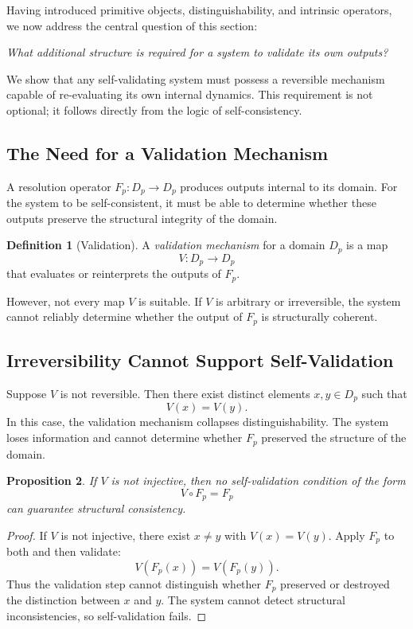 \documentclass[11pt]{article}
\theoremstyle{definition}
\newtheorem{definition}{Definition}[section]
\theoremstyle{plain}
\newtheorem{proposition}[definition]{Proposition}
\theoremstyle{remark}
\begin{document}
Having introduced primitive objects, distinguishability, and intrinsic
operators, we now address the central question of this section:

\emph{What additional structure is required for a system to validate its
own outputs?}

We show that any self-validating system must possess a reversible
mechanism capable of re-evaluating its own internal dynamics. This
requirement is not optional; it follows directly from the logic of
self-consistency.

\subsection{The Need for a Validation Mechanism}

A resolution operator $F_p : D_p \to D_p$ produces outputs internal to
its domain. For the system to be self-consistent, it must be able to
determine whether these outputs preserve the structural integrity of the
domain.

\begin{definition}[Validation]
A \emph{validation mechanism} for a domain $D_p$ is a map
\[
V : D_p \to D_p
\]
that evaluates or reinterprets the outputs of $F_p$.
\end{definition}

However, not every map $V$ is suitable. If $V$ is arbitrary or
irreversible, the system cannot reliably determine whether the output of
$F_p$ is structurally coherent.

\subsection{Irreversibility Cannot Support Self-Validation}

Suppose $V$ is not reversible. Then there exist distinct elements
$x,y \in D_p$ such that
\[
V(x) = V(y).
\]
In this case, the validation mechanism collapses distinguishability. The
system loses information and cannot determine whether $F_p$ preserved
the structure of the domain.

\begin{proposition}
If $V$ is not injective, then no self-validation condition of the form
\[
V \circ F_p = F_p
\]
can guarantee structural consistency.
\end{proposition}

\begin{proof}
If $V$ is not injective, there exist $x \neq y$ with $V(x)=V(y)$. Apply
$F_p$ to both and then validate:
\[
V(F_p(x)) = V(F_p(y)).
\]
Thus the validation step cannot distinguish whether $F_p$ preserved or
destroyed the distinction between $x$ and $y$. The system cannot detect
structural inconsistencies, so self-validation fails.
\end{proof}
\end{document}

